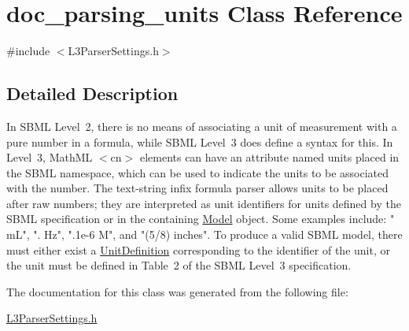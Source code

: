 \hypertarget{classdoc__parsing__units}{}\section{doc\+\_\+parsing\+\_\+units Class Reference}
\label{classdoc__parsing__units}


{\ttfamily \#include $<$L3\+Parser\+Settings.\+h$>$}



\subsection{Detailed Description}
\begin{DoxyParagraph}{}
In S\+B\+ML Level~2, there is no means of associating a unit of measurement with a pure number in a formula, while S\+B\+ML Level~3 does define a syntax for this. In Level~3, Math\+ML {\ttfamily $<$cn$>$} elements can have an attribute named {\ttfamily units} placed in the S\+B\+ML namespace, which can be used to indicate the units to be associated with the number. The text-\/string infix formula parser allows units to be placed after raw numbers; they are interpreted as unit identifiers for units defined by the S\+B\+ML specification or in the containing \hyperlink{class_model}{Model} object. Some examples include\+: "{ mL}", "{. Hz}", "{.\+1e-\/6 M}", and "{\ttfamily (5/8) inches}". To produce a valid S\+B\+ML model, there must either exist a \hyperlink{class_unit_definition}{Unit\+Definition} corresponding to the identifier of the unit, or the unit must be defined in Table~2 of the S\+B\+ML Level~3 specification. 
\end{DoxyParagraph}


The documentation for this class was generated from the following file\+:\begin{DoxyCompactItemize}
\item 
\hyperlink{_l3_parser_settings_8h}{L3\+Parser\+Settings.\+h}\end{DoxyCompactItemize}
